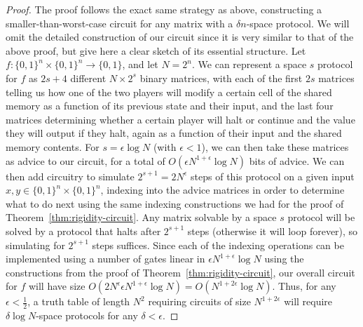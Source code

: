 \begin{proof}
The proof follows the exact same strategy as above, constructing a smaller-than-worst-case circuit for any matrix with a $\delta n$-space protocol. We will omit the detailed construction of our circuit since it is very similar to that of the above proof, but give here a clear sketch of its essential structure. Let $f: \{0,1\}^n \times \{0,1\}^n \rightarrow \{0,1\}$, and let $N = 2^n$. We can represent a space $s$ protocol for $f$ as $2s + 4$ different $N \times 2^s$ binary matrices, with each of the first $2s$ matrices telling us how one of the two players will modify a certain cell of the shared memory as a function of its previous state and their input, and the last four matrices determining whether a certain player will halt or continue and the value they will output if they halt, again as a function of their input and the shared memory contents. For $s = \epsilon \log N$ (with $\epsilon < 1$), we can then take these matrices as advice to our circuit, for a total of $O(\epsilon N^{1 + \epsilon} \log N)$ bits of advice. We can then add circuitry to simulate $2^{s+1} = 2N^{\epsilon}$ steps of this protocol on a given input $x,y \in \{0,1\}^n \times \{0,1\}^n$, indexing into the advice matrices in order to determine what to do next using the same indexing constructions we had for the proof of Theorem~\ref{thm:rigidity-circuit}. Any matrix solvable by a space $s$ protocol will be solved by a protocol that halts after $2^{s+1}$ steps (otherwise it will loop forever), so simulating for $2^{s+1}$ steps suffices. Since each of the indexing operations can be implemented using a number of gates linear in $\epsilon N^{1 + \epsilon} \log N$ using the constructions from the proof of Theorem~\ref{thm:rigidity-circuit}, our overall circuit for $f$ will have size $O(2N^{\epsilon}\epsilon N^{1 + \epsilon} \log N) = O(N^{1 + 2\epsilon} \log N)$. Thus, for any $\epsilon < \frac{1}{2}$, a truth table of length $N^2$ requiring circuits of size $N^{1 + 2\epsilon}$ will require $\delta \log N$-space protocols for any $\delta < \epsilon$.
\end{proof}

